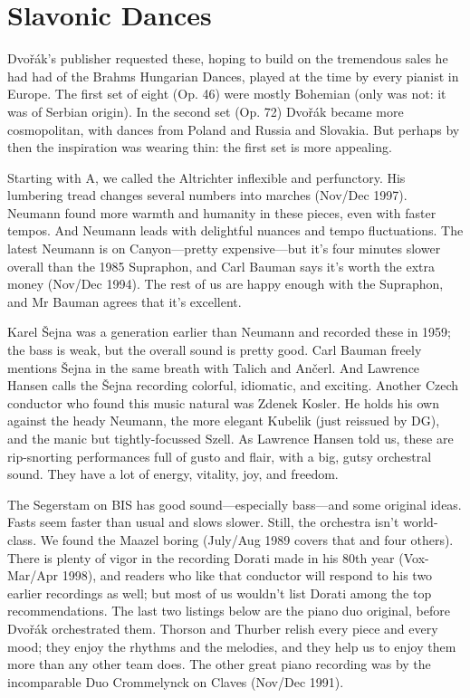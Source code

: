 \documentclass[12pt]{article}%
\begin{document}
\section{Slavonic Dances}

Dvořák's publisher requested these, hoping to build on the tremendous sales he had had of the Brahms Hungarian Dances, played at the time by every pianist in Europe. The first set of eight (Op. 46) were mostly Bohemian (only  was not: it was of Serbian origin). In the second set (Op. 72) Dvořák became more cosmopolitan, with dances from Poland and Russia and Slovakia. But perhaps by then the inspiration was wearing thin: the first set is more appealing.

Starting with A, we called the Altrichter inflexible and perfunctory. His lumbering tread changes several numbers into marches (Nov/Dec 1997). Neumann found more warmth and humanity in these pieces, even with faster tempos. And Neumann leads with delightful nuances and tempo fluctuations.
The latest Neumann is on Canyon---pretty expensive---but it's four minutes slower overall than the 1985 Supraphon, and Carl Bauman says it's worth the extra money (Nov/Dec
1994). The rest of us are happy enough with the Supraphon, and Mr Bauman agrees that
it's excellent.

Karel Šejna was a generation earlier than
Neumann and recorded these in 1959; the bass is weak, but the overall sound is pretty good.
Carl Bauman freely mentions Šejna in the same breath with Talich and Ančerl. And Lawrence Hansen calls the Šejna recording colorful, idiomatic, and exciting. Another Czech conductor who found this music natural was Zdenek Kosler. He holds his own against the heady Neumann, the more elegant Kubelik (just reissued by DG), and the manic but tightly-focussed Szell. As Lawrence Hansen told us, these are rip-snorting performances full of gusto and flair, with a big, gutsy orchestral sound. They have a lot of energy, vitality, joy, and freedom.

The Segerstam on BIS has good sound---especially bass---and some original ideas. Fasts seem faster than usual and slows slower. Still, the orchestra isn't world-class. We found the
Maazel boring (July/Aug 1989 covers that and four others). There is plenty of vigor in the recording Dorati made in his 80th year (Vox-Mar/Apr 1998), and readers who like that conductor will respond to his two earlier recordings as well; but most of us wouldn't list Dorati among the top recommendations.
The last two listings below are the piano duo original, before Dvořák orchestrated them.
Thorson and Thurber relish every piece and every mood; they enjoy the rhythms and the melodies, and they help us to enjoy them more than any other team does. The other great piano recording was by the incomparable Duo Crommelynck on Claves (Nov/Dec 1991).
\end{document}
